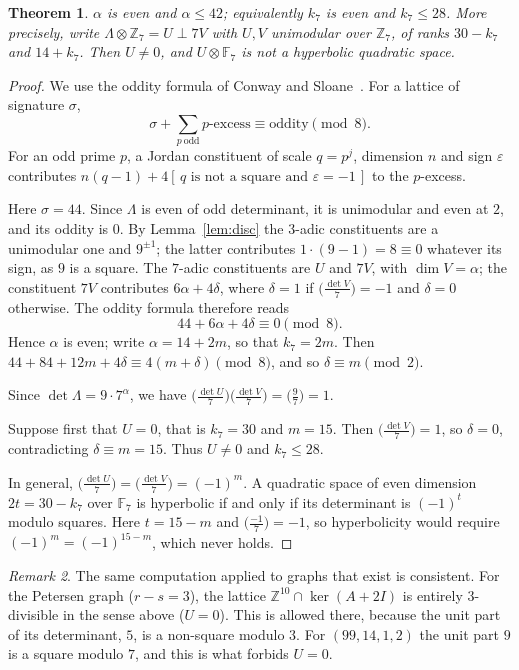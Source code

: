 \documentclass[11pt]{amsart}
\newtheorem{theorem}{Theorem}
\theoremstyle{remark}
\newtheorem{remark}[theorem]{Remark}
\newcommand{\Z}{\mathbb{Z}}
\newcommand{\F}{\mathbb{F}}
\begin{document}
\begin{theorem}\label{thm:genus}
$\alpha$ is even and $\alpha\le42$; equivalently $k_7$ is even and $k_7\le28$. More precisely, write
$\Lambda\otimes\Z_7=U\perp 7V$ with $U,V$ unimodular over $\Z_7$, of ranks $30-k_7$ and $14+k_7$. Then $U\ne0$, and
$U\otimes\F_7$ is not a hyperbolic quadratic space.
\end{theorem}
\begin{proof}
We use the oddity formula of Conway and Sloane~\cite[Ch.~15, \S7]{CS}. For a lattice of signature $\sigma$,
\[
\sigma+\sum_{p\ \mathrm{odd}}p\text{-excess}\equiv\text{oddity}\pmod8 .
\]
For an odd prime $p$, a Jordan constituent of scale $q=p^j$, dimension $n$ and sign $\varepsilon$ contributes
$n(q-1)+4[\,q\text{ is not a square and }\varepsilon=-1\,]$ to the $p$-excess.

Here $\sigma=44$. Since $\Lambda$ is even of odd determinant, it is unimodular and even at $2$, and its oddity is $0$. By
Lemma~\ref{lem:disc} the $3$-adic constituents are a unimodular one and $9^{\pm1}$; the latter contributes
$1\cdot(9-1)=8\equiv0$ whatever its sign, as $9$ is a square. The $7$-adic constituents are $U$ and $7V$, with $\dim V=\alpha$;
the constituent $7V$ contributes $6\alpha+4\delta$, where $\delta=1$ if $\big(\tfrac{\det V}{7}\big)=-1$ and $\delta=0$
otherwise. The oddity formula therefore reads
\[
44+6\alpha+4\delta\equiv0\pmod8 .
\]
Hence $\alpha$ is even; write $\alpha=14+2m$, so that $k_7=2m$. Then $44+84+12m+4\delta\equiv4(m+\delta)\pmod 8$, and so
$\delta\equiv m\pmod2$.

Since $\det\Lambda=9\cdot7^\alpha$, we have $\big(\tfrac{\det U}{7}\big)\big(\tfrac{\det V}{7}\big)=\big(\tfrac{9}{7}\big)=1$.

Suppose first that $U=0$, that is $k_7=30$ and $m=15$. Then $\big(\tfrac{\det V}{7}\big)=1$, so $\delta=0$, contradicting
$\delta\equiv m=15$. Thus $U\ne0$ and $k_7\le28$.

In general, $\big(\tfrac{\det U}{7}\big)=\big(\tfrac{\det V}{7}\big)=(-1)^{m}$. A quadratic space of even dimension $2t=30-k_7$
over $\F_7$ is hyperbolic if and only if its determinant is $(-1)^t$ modulo squares. Here $t=15-m$ and
$\big(\tfrac{-1}{7}\big)=-1$, so hyperbolicity would require $(-1)^m=(-1)^{15-m}$, which never holds.
\end{proof}

\begin{remark}
The same computation applied to graphs that exist is consistent. For the Petersen graph ($r-s=3$), the lattice
$\Z^{10}\cap\ker(A+2I)$ is entirely $3$-divisible in the sense above ($U=0$). This is allowed there, because the unit part
of its determinant, $5$, is a non-square modulo $3$. For $(99,14,1,2)$ the unit part $9$ is a square modulo $7$, and this is
what forbids $U=0$.
\end{remark}
\end{document}
